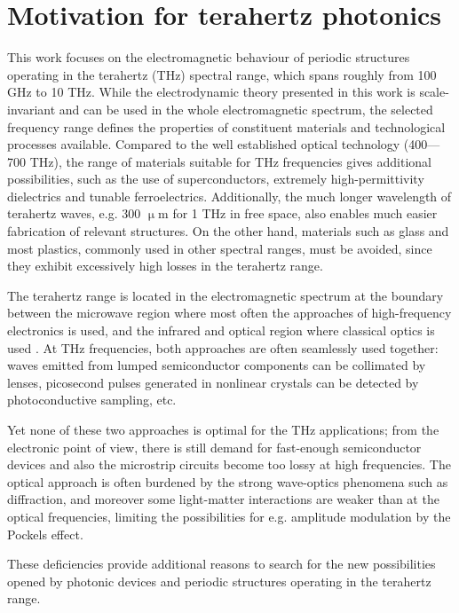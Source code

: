 \section{Motivation for terahertz photonics} %
This work focuses on the electromagnetic behaviour of periodic structures operating in the terahertz (THz) spectral range, which spans roughly from 100 GHz to 10 THz. While the electrodynamic theory presented in this work is scale-invariant and can be used in the whole electromagnetic spectrum, the selected frequency range defines the properties of constituent materials and technological processes available. Compared to the well established optical technology (400---700 THz), the range of materials suitable for THz frequencies gives additional possibilities, such as the use of superconductors, extremely high-permittivity dielectrics and tunable ferroelectrics. Additionally, the much longer wavelength of terahertz waves, e.g. 300 $\upmu$m for 1 THz in free space, also enables much easier fabrication of relevant structures. On the other hand, materials such as glass and most plastics, commonly used in other spectral ranges, must be avoided, since they exhibit excessively high losses in the terahertz range.

The terahertz range is located in the electromagnetic spectrum at the boundary between the microwave region where most often the approaches of high-frequency electronics is used, and the infrared and optical region where classical optics is used \cite{ozyuzer2007emission}. At THz frequencies, both approaches are often seamlessly used together: waves emitted from lumped semiconductor components can be collimated by lenses, picosecond pulses generated in nonlinear crystals can be detected by photoconductive sampling, etc.  %

Yet none of these two approaches is optimal for the THz applications; from the electronic point of view, there is still demand for fast-enough semiconductor devices and also the microstrip circuits become too lossy at high frequencies. The optical approach is often burdened by the strong wave-optics phenomena such as diffraction, and moreover some light-matter interactions are weaker than at the optical frequencies, limiting the possibilities for e.g. amplitude modulation by the Pockels effect. 

These deficiencies provide additional reasons to search for the new possibilities opened by photonic devices and periodic structures operating in the terahertz range.  

